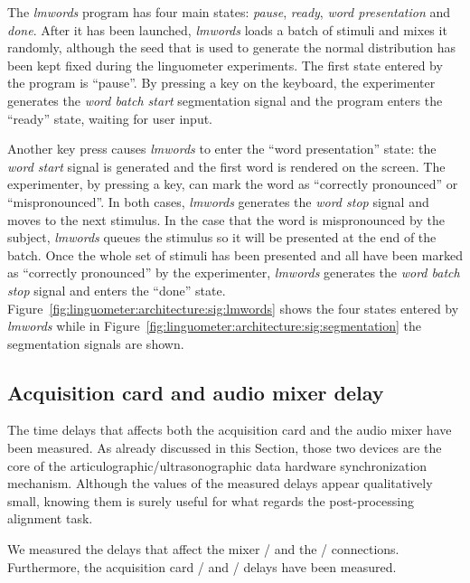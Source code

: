 The \emph{lmwords} program has four main states: \emph{pause}, \emph{ready},
\emph{word presentation} and \emph{done}.
After it has been launched, \emph{lmwords} loads a batch of stimuli and mixes it
randomly, although the seed that is used to generate the normal distribution has
been kept fixed during the linguometer experiments.
The first state entered by the program is ``pause''. By pressing a key on
the  keyboard, the experimenter generates the \emph{word batch start}
segmentation signal and the program enters the ``ready'' state, waiting for
user input.


Another key press causes \emph{lmwords} to enter the ``word presentation''
state: the \emph{word start} signal is generated and the first word is 
rendered on the screen.
The experimenter, by pressing a key, can mark the word as ``correctly
pronounced'' or ``mispronounced''. 
In both cases, \emph{lmwords} generates the \emph{word stop} signal and 
moves to the next stimulus.
In the case that the word is mispronounced by the subject, \emph{lmwords} queues
the stimulus so it will be presented at the end of the batch.
Once the whole set of stimuli has been presented and all
have been marked as ``correctly pronounced'' by the experimenter,
\emph{lmwords} generates the \emph{word batch stop} signal and enters 
the ``done'' state.
Figure~\ref{fig:linguometer:architecture:sig:lmwords} shows the four
states entered by \emph{lmwords} while 
in Figure~\ref{fig:linguometer:architecture:sig:segmentation} the segmentation
signals are shown.
\subsection{Acquisition card and audio mixer delay}
\label{sec:linguometer:technical:delay}
The time delays that affects both the acquisition card and the 
audio mixer have been measured.
As already discussed in this Section, those two devices are the core of the
articulographic/ultrasonographic data hardware synchronization mechanism.
Although the values of the measured delays appear qualitatively small, knowing 
them is surely useful for what regards the post-processing alignment task.

We measured the delays that affect the  mixer
/ and the
/ connections.
Furthermore, the   acquisition card
/ and
/ delays have been measured.

